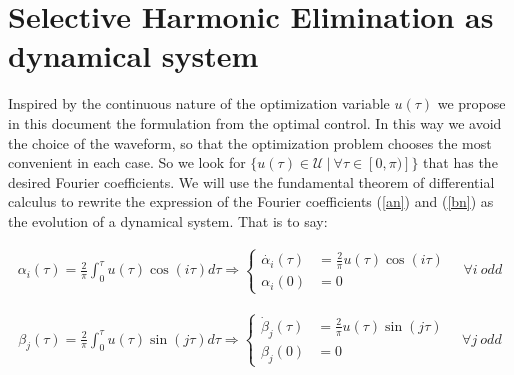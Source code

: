 
\section{Selective Harmonic Elimination as dynamical system}

%


Inspired by the continuous nature of the optimization variable $ u (\tau) $ we propose in this document the formulation from the optimal control. In this way we avoid the choice of the waveform, so that the optimization problem chooses the most convenient in each case. So we look for $ \{u (\tau) \in \mathcal{U} \ | \ \forall \tau \in [0, \pi)] \} $ that has the desired Fourier coefficients.
%
We will use the fundamental theorem of differential calculus to rewrite the expression of the Fourier coefficients (\ref {an}) and (\ref {bn}) as the evolution of a dynamical system. That is to say:

\begin{gather}
    \alpha_i(\tau) = \frac{2}{\pi}\int_0^\tau u(\tau) \cos(i\tau)d\tau 
    \Rightarrow
    \begin{cases} \label{ode}
        \dot{\alpha_i}(\tau) & = \frac{2}{\pi}u(\tau)\cos(i\tau) \\  
        \alpha_i(0) & = 0       
    \end{cases}
    \hspace{1em} \forall i \ odd
\end{gather}

\begin{gather}
    \beta_j(\tau) = \frac{2}{\pi}\int_0^\tau u(\tau) \sin(j\tau)d\tau 
    \Rightarrow
    \begin{cases} \label{ode}
        \dot{\beta}_j(\tau) & = \frac{2}{\pi}u(\tau)\sin(j\tau) \\  
        \beta_j(0) & = 0       
    \end{cases}
    \hspace{1em} \forall j \ odd
\end{gather}

